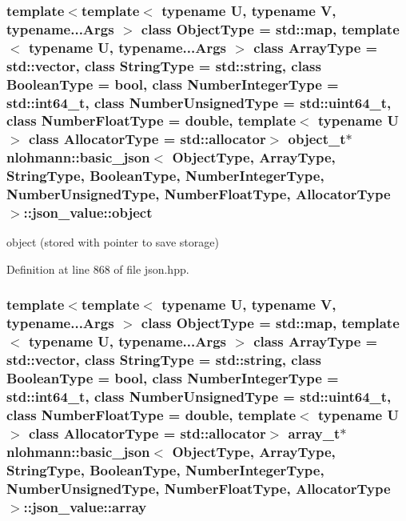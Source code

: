 \subsubsection[{object}]{\setlength{\rightskip}{0pt plus 5cm}template$<$template$<$ typename U, typename V, typename...\+Args $>$ class Object\+Type = std\+::map, template$<$ typename U, typename...\+Args $>$ class Array\+Type = std\+::vector, class String\+Type  = std\+::string, class Boolean\+Type  = bool, class Number\+Integer\+Type  = std\+::int64\+\_\+t, class Number\+Unsigned\+Type  = std\+::uint64\+\_\+t, class Number\+Float\+Type  = double, template$<$ typename U $>$ class Allocator\+Type = std\+::allocator$>$ {\bf object\+\_\+t}$\ast$ {\bf nlohmann\+::basic\+\_\+json}$<$ Object\+Type, Array\+Type, String\+Type, Boolean\+Type, Number\+Integer\+Type, Number\+Unsigned\+Type, Number\+Float\+Type, Allocator\+Type $>$\+::json\+\_\+value\+::object}\label{unionnlohmann_1_1basic__json_1_1json__value_a7a13ca826f514efb9de04f1d5ddfb20c}


object (stored with pointer to save storage) 



Definition at line 868 of file json.\+hpp.

\hypertarget{unionnlohmann_1_1basic__json_1_1json__value_ad273d6cf5c8662592ecb445121687954}{}
\subsubsection[{array}]{\setlength{\rightskip}{0pt plus 5cm}template$<$template$<$ typename U, typename V, typename...\+Args $>$ class Object\+Type = std\+::map, template$<$ typename U, typename...\+Args $>$ class Array\+Type = std\+::vector, class String\+Type  = std\+::string, class Boolean\+Type  = bool, class Number\+Integer\+Type  = std\+::int64\+\_\+t, class Number\+Unsigned\+Type  = std\+::uint64\+\_\+t, class Number\+Float\+Type  = double, template$<$ typename U $>$ class Allocator\+Type = std\+::allocator$>$ {\bf array\+\_\+t}$\ast$ {\bf nlohmann\+::basic\+\_\+json}$<$ Object\+Type, Array\+Type, String\+Type, Boolean\+Type, Number\+Integer\+Type, Number\+Unsigned\+Type, Number\+Float\+Type, Allocator\+Type $>$\+::json\+\_\+value\+::array}\label{unionnlohmann_1_1basic__json_1_1json__value_ad273d6cf5c8662592ecb445121687954}


